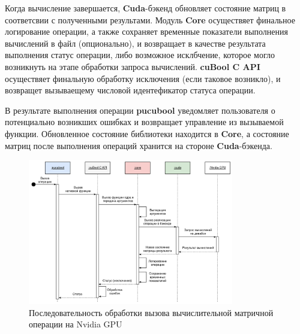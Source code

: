 Когда вычисление завершается, \textbf{Cuda}-бэкенд обновляет состояние матриц в соответсвии с полученными результами. Модуль \textbf{Core} осуществяет финальное логирование операции, а также сохраняет временные показатели выполнения вычислений в файл (опционально), и возвращает в качестве результата выполнения статус операции, либо возможное исклбчение, которое могло возникнуть на этапе обработки запроса вычислений. \textbf{cuBool C API} осуществяет финальную обработку исключения (если таковое возникло), и возвращет вызываещему числовой идентефикатор статуса операции. 

В результате выполнения операции \textbf{pucubool} уведомляет пользователя о потенциально возникших ошибках и возвращает управление из вызываемой функции. Обновленное состояние библиотеки находится в \textbf{Core}, а состояние матриц после выполнения операций хранится на стороне \textbf{Cuda}-бэкенда. 

\begin{figure}[h]
    \centering
    \includegraphics[width=0.8\textwidth]{images/library_sequence_use.png}
    \caption{Последовательность обработки вызова вычислительной матричной операции на Nvidia GPU}
    \label{fig:cubool_sequence}
\end{figure}


